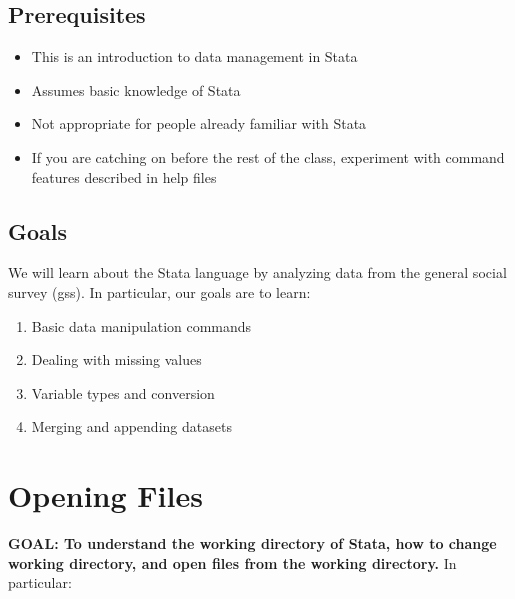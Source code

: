 \documentclass[
]{book}
\providecommand{\tightlist}{%
  \setlength{\itemsep}{0pt}\setlength{\parskip}{0pt}}
\begin{document}
\hypertarget{prerequisites-7}{%
\subsection{Prerequisites}\label{prerequisites-7}}

\begin{itemize}
\tightlist
\item
  This is an introduction to data management in Stata
\item
  Assumes basic knowledge of Stata
\item
  Not appropriate for people already familiar with Stata
\item
  If you are catching on before the rest of the class, experiment with command features described in help files
\end{itemize}

\hypertarget{goals-6}{%
\subsection{Goals}\label{goals-6}}

\begin{alert}

We will learn about the Stata language by analyzing data from the general social survey (gss). In particular, our goals are to learn:

\begin{enumerate}
\def\labelenumi{\arabic{enumi}.}
\tightlist
\item
  Basic data manipulation commands
\item
  Dealing with missing values
\item
  Variable types and conversion
\item
  Merging and appending datasets
\end{enumerate}

\end{alert}

\hypertarget{opening-files}{%
\section{Opening Files}\label{opening-files}}

\begin{alert}

\textbf{GOAL: To understand the working directory of Stata, how to change working directory, and open files from the working directory.} In particular:

\end{alert}
\end{document}

